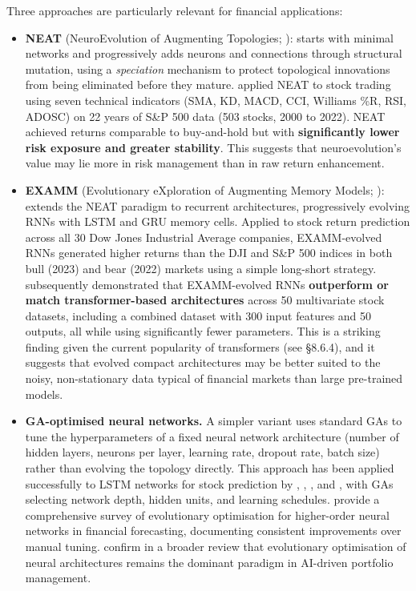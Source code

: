 Three approaches are particularly relevant for financial applications:

\begin{itemize}
\item \textbf{NEAT} (NeuroEvolution of Augmenting Topologies; \citep{Stanley2002}): starts with minimal networks and progressively adds neurons and connections through structural mutation, using a \textit{speciation} mechanism to protect topological innovations from being eliminated before they mature. \cite{HuangLC2025} applied NEAT to stock trading using seven technical indicators (SMA, KD, MACD, CCI, Williams \%R, RSI, ADOSC) on 22 years of S\&P 500 data (503 stocks, 2000 to 2022). NEAT achieved returns comparable to buy-and-hold but with \textbf{significantly lower risk exposure and greater stability}. This suggests that neuroevolution's value may lie more in risk management than in raw return enhancement.
\item \textbf{EXAMM} (Evolutionary eXploration of Augmenting Memory Models; \citep{Lyu2024}): extends the NEAT paradigm to recurrent architectures, progressively evolving RNNs with LSTM and GRU memory cells. Applied to stock return prediction across all 30 Dow Jones Industrial Average companies, EXAMM-evolved RNNs generated higher returns than the DJI and S\&P 500 indices in both bull (2023) and bear (2022) markets using a simple long-short strategy. \cite{LyuZ2025} subsequently demonstrated that EXAMM-evolved RNNs \textbf{outperform or match transformer-based architectures} across 50 multivariate stock datasets, including a combined dataset with 300 input features and 50 outputs, all while using significantly fewer parameters. This is a striking finding given the current popularity of transformers (see §8.6.4), and it suggests that evolved compact architectures may be better suited to the noisy, non-stationary data typical of financial markets than large pre-trained models.
\item \textbf{GA-optimised neural networks.} A simpler variant uses standard GAs to tune the hyperparameters of a fixed neural network architecture (number of hidden layers, neurons per layer, learning rate, dropout rate, batch size) rather than evolving the topology directly. This approach has been applied successfully to LSTM networks for stock prediction by \cite{Chung2018}, \cite{Chen2021}, \cite{Abraham2022}, and \cite{Zeng2022}, with GAs selecting network depth, hidden units, and learning schedules. \cite{Behera2023} provide a comprehensive survey of evolutionary optimisation for higher-order neural networks in financial forecasting, documenting consistent improvements over manual tuning. \cite{Sutiene2024} confirm in a broader review that evolutionary optimisation of neural architectures remains the dominant paradigm in AI-driven portfolio management.
\end{itemize}

